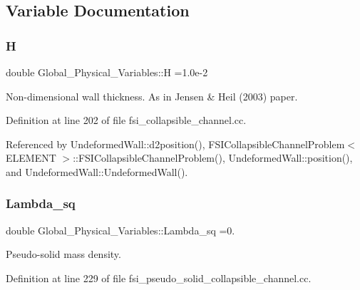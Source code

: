 \subsection{Variable Documentation}
\mbox{\label{namespaceGlobal__Physical__Variables_af6e07423e22c0991084d9a2f43727805}} 
\subsubsection{\texorpdfstring{H}{H}}
{\footnotesize\ttfamily double Global\+\_\+\+Physical\+\_\+\+Variables\+::H =1.\+0e-\/2}



Non-\/dimensional wall thickness. As in Jensen \& Heil (2003) paper. 



Definition at line 202 of file fsi\+\_\+collapsible\+\_\+channel.\+cc.



Referenced by Undeformed\+Wall\+::d2position(), F\+S\+I\+Collapsible\+Channel\+Problem$<$ E\+L\+E\+M\+E\+N\+T $>$\+::\+F\+S\+I\+Collapsible\+Channel\+Problem(), Undeformed\+Wall\+::position(), and Undeformed\+Wall\+::\+Undeformed\+Wall().

\mbox{\label{namespaceGlobal__Physical__Variables_a6fe17557ceb32dd353827fba60408363}} 
\subsubsection{\texorpdfstring{Lambda\+\_\+sq}{Lambda\_sq}}
{\footnotesize\ttfamily double Global\+\_\+\+Physical\+\_\+\+Variables\+::\+Lambda\+\_\+sq =0.}



Pseudo-\/solid mass density. 



Definition at line 229 of file fsi\+\_\+pseudo\+\_\+solid\+\_\+collapsible\+\_\+channel.\+cc.




